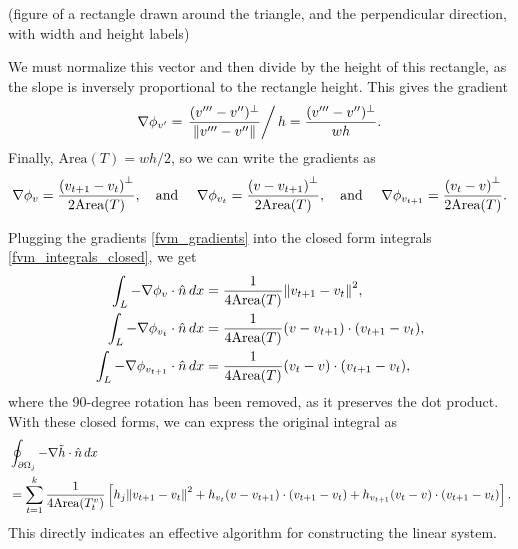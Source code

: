 \vskip 0.2in
(figure of a rectangle drawn around the triangle, and the perpendicular direction, with width and height labels)
\vskip 0.2in

We must normalize this vector and then divide by the height of this rectangle, as the slope is inversely proportional to the rectangle height.
This gives the gradient
$$
    \nabla\phi_{v^{\prime}} = \left.\frac{(v^{\prime\prime\prime} - v^{\prime\prime})^\perp}{\norm{v^{\prime\prime\prime} - v^{\prime\prime}}}\right/h = \frac{(v^{\prime\prime\prime} - v^{\prime\prime})^\perp}{wh}.
$$
Finally, $\text{Area}(T) = wh/2$, so we can write the gradients as
\begin{equation}\label{fvm_gradients}
    \nabla\phi_v = \frac{\left(v_{t+1} - v_t\right)^\perp}{2\text{Area}(T)},\text{\quad and \quad}
    \nabla\phi_{v_t} = \frac{\left(v - v_{t+1}\right)^\perp}{2\text{Area}(T)},\text{\quad and \quad}
    \nabla\phi_{v_{t+1}} = \frac{\left(v_t - v\right)^\perp}{2\text{Area}(T)}.
\end{equation}

Plugging the gradients \eqref{fvm_gradients} into the closed form integrals \eqref{fvm_integrals_closed}, we get
\begin{align*}
    \int_L -\nabla\phi_v\cdot\hat{n}\,dx
        &= \frac{1}{4\text{Area}(T)}\norm{v_{t+1} - v_t}^2,\\
    \int_L -\nabla\phi_{v_t}\cdot\hat{n}\,dx
        &= \frac{1}{4\text{Area}(T)}(v - v_{t+1})\cdot(v_{t+1} - v_t),\\
    \int_L -\nabla\phi_{v_{t+1}}\cdot\hat{n}\,dx
        &= \frac{1}{4\text{Area}(T)}(v_t - v)\cdot(v_{t+1} - v_t),
\end{align*}
where the 90-degree rotation has been removed, as it preserves the dot product.
With these closed forms, we can express the original integral as
\begin{equation}\label{flux_integral_summation}
\begin{split}
&\oint_{{\partial\Omega}_j} -\nabla \tilde{h}\cdot\hat{n}\,dx\\
    &=
    \sum_{t=1}^k
        \frac{1}{4\text{Area}(T^v_t)}
        \left[
        h_j \norm{v_{t+1} - v_{t}}^2
        +h_{v_t}(v - v_{t+1})\cdot(v_{t+1} - v_{t})
        +h_{v_{t+1}}(v_t - v)\cdot(v_{t+1} - v_{t})
        \right].
\end{split}
\end{equation}
This directly indicates an effective algorithm for constructing the linear system.

